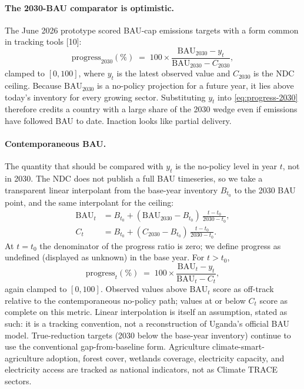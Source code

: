 \documentclass{article}
\begin{document}
\paragraph{The 2030-BAU comparator is optimistic.}
The June 2026 prototype scored BAU-cap emissions targets with a form common in tracking tools [10]:
\begin{equation}
\label{eq:progress-2030}
  \mathrm{progress}_{2030}(\%)
  \;=\;
  100 \times
  \frac{\mathrm{BAU}_{2030} - y_{t}}{\mathrm{BAU}_{2030} - C_{2030}},
\end{equation}
clamped to $[0,100]$, where $y_{t}$ is the latest observed value and $C_{2030}$ is the NDC ceiling. Because $\mathrm{BAU}_{2030}$ is a no-policy projection for a future year, it lies above today's inventory for every growing sector. Substituting $y_{t}$ into \eqref{eq:progress-2030} therefore credits a country with a large share of the 2030 wedge even if emissions have followed BAU to date. Inaction looks like partial delivery.

\paragraph{Contemporaneous BAU.}
The quantity that should be compared with $y_{t}$ is the no-policy level in year $t$, not in 2030. The NDC does not publish a full BAU timeseries, so we take a transparent linear interpolant from the base-year inventory $B_{t_0}$ to the 2030 BAU point, and the same interpolant for the ceiling:
\begin{align}
\label{eq:bau-t}
  \mathrm{BAU}_{t}
  &=
  B_{t_0} + (\mathrm{BAU}_{2030}-B_{t_0})\,\frac{t-t_0}{2030-t_0}, \\
\label{eq:cap-t}
  C_{t}
  &=
  B_{t_0} + (C_{2030}-B_{t_0})\,\frac{t-t_0}{2030-t_0}.
\end{align}
At $t=t_0$ the denominator of the progress ratio is zero; we define progress as undefined (displayed as unknown) in the base year. For $t>t_0$,
\begin{equation}
\label{eq:progress-t}
  \mathrm{progress}_{t}(\%)
  \;=\;
  100 \times
  \frac{\mathrm{BAU}_{t} - y_{t}}{\mathrm{BAU}_{t} - C_{t}},
\end{equation}
again clamped to $[0,100]$. Observed values above $\mathrm{BAU}_{t}$ score as off-track relative to the contemporaneous no-policy path; values at or below $C_{t}$ score as complete on this metric. Linear interpolation is itself an assumption, stated as such: it is a tracking convention, not a reconstruction of Uganda's official BAU model. True-reduction targets (2030 below the base-year inventory) continue to use the conventional gap-from-baseline form. Agriculture climate-smart-agriculture adoption, forest cover, wetlands coverage, electricity capacity, and electricity access are tracked as national indicators, not as Climate TRACE sectors.
\end{document}
